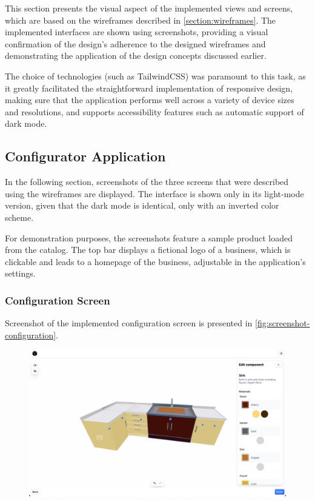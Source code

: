 This section presents the visual aspect of the implemented views and screens, which are based on the wireframes described in \autoref{section:wireframes}. The implemented interfaces are shown using screenshots, providing a visual confirmation of the design's adherence to the designed wireframes and demonstrating the application of the design concepts discussed earlier.

The choice of technologies (such as TailwindCSS) was paramount to this task, as it greatly facilitated the straightforward implementation of responsive design, making sure that the application performs well across a variety of device sizes and resolutions, and supports accessibility features such as automatic support of dark mode.


\subsection{Configurator Application}

In the following section, screenshots of the three screens that were described using the wireframes are displayed. The interface is shown only in its light-mode version, given that the dark mode is identical, only with an inverted color scheme.

For demonstration purposes, the screenshots feature a sample product loaded from the catalog. The top bar displays a fictional logo of a business, which is clickable and leads to a homepage of the business, adjustable in the application's settings.  


\subsubsection{Configuration Screen}

Screenshot of the implemented configuration screen is presented in \autoref{fig:screenshot-configuration}.

\begin{figure}[h]
\centering
\includegraphics[width=\textwidth]{images/screenshot_configuration.png}
\label{fig:screenshot-configuration}
\end{figure}

